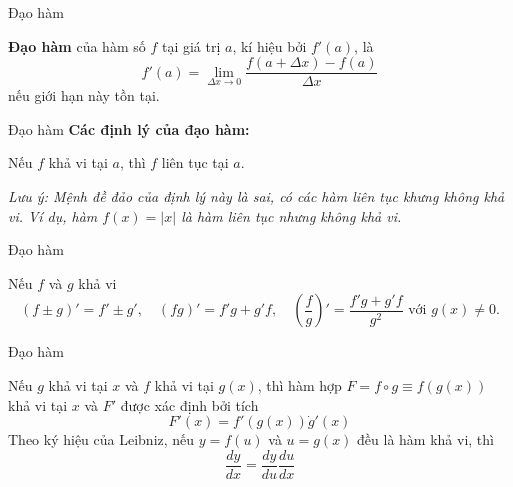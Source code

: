 \begin{frame}{Đạo hàm}
    \begin{tcolorbox}[colback=blue!10, colframe=blue!50!black, title=Định nghĩa]
    \textbf{Đạo hàm} của hàm số $f$ tại giá trị $a$, kí hiệu bởi $f'(a)$, là
    \begin{equation}
        f'(a)=\lim_{\Delta x\rightarrow 0}\dfrac{f(a+\Delta x)-f(a)}{\Delta x}
    \end{equation}
    nếu giới hạn này tồn tại.
    \end{tcolorbox}
\end{frame}
\begin{frame}{Đạo hàm}
    \textbf{Các định lý của đạo hàm:}
\begin{tcolorbox}[colback=blue!10, colframe=blue!50!black, title=Định lý]
Nếu $f$ khả vi tại $a$, thì $f$ liên tục tại $a$.
\end{tcolorbox}
\textit{Lưu ý: Mệnh đề đảo của định lý này là sai, có các hàm liên tục khưng không khả vi. Ví dụ, hàm $f(x)=|x|$ là hàm liên tục nhưng không khả vi.}
\end{frame}
\begin{frame}{Đạo hàm}
\begin{tcolorbox}[colback=blue!10, colframe=blue!50!black, title=Định lý]
Nếu $f$ và $g$ khả vi
$$
    (f\pm g)'=f'\pm g',\quad (fg)'=f'g+g'f,\quad \left(\dfrac{f}{g}\right)'=\dfrac{f'g+g'f}{g^2}\text{ với }g(x)\neq 0.
$$
\end{tcolorbox}
\end{frame}
\begin{frame}{Đạo hàm}
    \begin{tcolorbox}[colback=blue!10, colframe=blue!50!black, title=Định lý đạo hàm hợp]
    Nếu $g$ khả vi tại $x$ và $f$ khả vi tại $g(x)$, thì hàm hợp $F=f\circ g\equiv f(g(x))$ khả vi tại $x$ và $F'$ được xác định bởi tích
    \begin{equation}
        F'(x)=f'(g(x))\dot g'(x)
    \end{equation}
    Theo ký hiệu của Leibniz, nếu $y=f(u)$ và $u=g(x)$ đều là hàm khả vi, thì
    \begin{equation}
        \dfrac{dy}{dx}=\dfrac{dy}{du}\dfrac{du}{dx}
    \end{equation}
    \end{tcolorbox}
\end{frame}